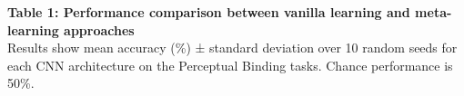 \begin{center}
\parbox{\textwidth}{
\centering
\large\textbf{Table 1: Performance comparison between vanilla learning and meta-learning approaches}\\[0.3em]
\normalsize Results show mean accuracy (\%) ± standard deviation over 10 random seeds for each CNN architecture on the Perceptual Binding tasks. Chance performance is 50\%.
}
\end{center}

